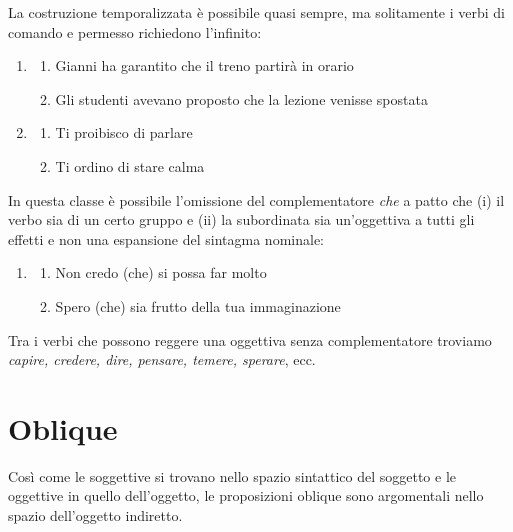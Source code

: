 \documentclass[
  a4paper,
  twoside,
  11pt,
  chapterprefix=false,
  bibliography=totocnumbered,
  listof=flat]{scrbook}
\providecommand{\tightlist}{%
  \setlength{\itemsep}{0pt}\setlength{\parskip}{0pt}}
\begin{document}
La costruzione temporalizzata è possibile quasi sempre, ma solitamente i verbi di comando e permesso richiedono l'infinito:

\begin{enumerate}
\def\labelenumi{(\arabic{enumi})}
\setcounter{enumi}{60}
\item
  \begin{enumerate}
  \def\labelenumii{\alph{enumii}.}
  \tightlist
  \item
    Gianni ha garantito che il treno partirà in orario
  \item
    Gli studenti avevano proposto che la lezione venisse spostata
  \end{enumerate}
\item
  \begin{enumerate}
  \def\labelenumii{\alph{enumii}.}
  \tightlist
  \item
    Ti proibisco di parlare
  \item
    Ti ordino di stare calma
  \end{enumerate}
\end{enumerate}

In questa classe è possibile l'omissione del complementatore \emph{che} a patto che (i) il verbo sia di un certo gruppo e (ii) la subordinata sia un'oggettiva a tutti gli effetti e non una espansione del sintagma nominale:

\begin{enumerate}
\def\labelenumi{(\arabic{enumi})}
\setcounter{enumi}{62}
\item
  \begin{enumerate}
  \def\labelenumii{\alph{enumii}.}
  \tightlist
  \item
    Non credo (che) si possa far molto
  \item
    Spero (che) sia frutto della tua immaginazione
  \end{enumerate}
\end{enumerate}

Tra i verbi che possono reggere una oggettiva senza complementatore troviamo \emph{capire, credere, dire, pensare, temere, sperare}, ecc.

\hypertarget{oblique}{%
\section{Oblique}\label{oblique}}

Così come le soggettive si trovano nello spazio sintattico del soggetto e le oggettive in quello dell'oggetto, le proposizioni oblique sono argomentali nello spazio dell'oggetto indiretto.
\end{document}
